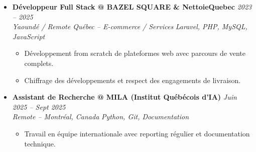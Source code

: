 \documentclass[a4paper,11pt]{article}
\begin{document}
\begin{itemize}[leftmargin=*, label={-}]
\item \textbf{Développeur Full Stack @ BAZEL SQUARE \& NettoieQuebec} \hfill \textit{2023 -- 2025} \\
\textit{Yaoundé / Remote Québec -- E-commerce / Services} \hfill \textit{Laravel, PHP, MySQL, JavaScript}
\vspace{-2pt}
    \begin{itemize}[leftmargin=0.4cm, nosep, label=\tiny$\bullet$]
        \item \small{Développement from scratch de plateformes web avec parcours de vente complets.}
        \item \small{Chiffrage des développements et respect des engagements de livraison.}
    \end{itemize}
\vspace{3pt}

\item \textbf{Assistant de Recherche @ MILA (Institut Québécois d'IA)} \hfill \textit{Juin 2025 -- Sept 2025} \\
\textit{Remote -- Montréal, Canada} \hfill \textit{Python, Git, Documentation}
\vspace{-2pt}
    \begin{itemize}[leftmargin=0.4cm, nosep, label=\tiny$\bullet$]
        \item \small{Travail en équipe internationale avec reporting régulier et documentation technique.}
    \end{itemize}
\vspace{3pt}

\end{itemize}

\end{document}
